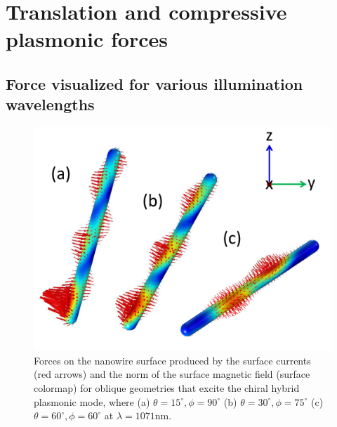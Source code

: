 \section{Translation and compressive plasmonic forces}\label{forces}
\subsection{Force visualized for various illumination wavelengths}
\begin{figure}[ht]
\centering\includegraphics[width = \textwidth]{fig4.pdf}
\caption{Forces on the nanowire surface produced by the surface currents (red arrows) and the norm of the surface magnetic field (surface colormap) for oblique geometries that excite the chiral hybrid plasmonic mode, where (a) $\theta = 15^\circ, \phi = 90^\circ$ (b) $\theta = 30^\circ, \phi = 75^\circ$ (c) $\theta = 60^\circ, \phi = 60^\circ$ at $\lambda = 1071$nm.}\label{wireforce}
\end{figure}

